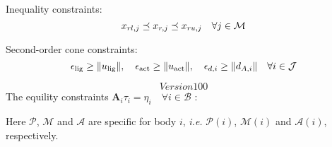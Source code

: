 \documentclass[a4paper,10pt]{article}
\begin{document}
\noindent Inequality constraints:
\begin{equation}\notag
x_{rl,j} \preceq x_{r,j} \preceq x_{ru,j} \quad \forall j\in \mathcal{M}
\end{equation}

\noindent Second-order cone constraints:
\begin{equation}\notag
\epsilon_\text{lig} \geq \| u_\text{lig} \|, \quad \epsilon_\text{act} \geq \| u_\text{act} \|, \quad
\epsilon_{d,i} \geq \| d_{A,i} \| \quad \forall i \in \mathcal{J}
\end{equation}

\pagebreak
\[Version 100\]
\noindent The equility constraints $\mathbf{A}_i \tau_i = \eta_i \quad \forall i \in \mathcal{B}$ :

Here $\mathcal{P}$, $\mathcal{M}$ and $\mathcal{A}$ are specific for body $i$,
\emph{i.e.} $\mathcal{P}(i)$, $\mathcal{M}(i)$ and $\mathcal{A}(i)$, respectively.
\end{document}
